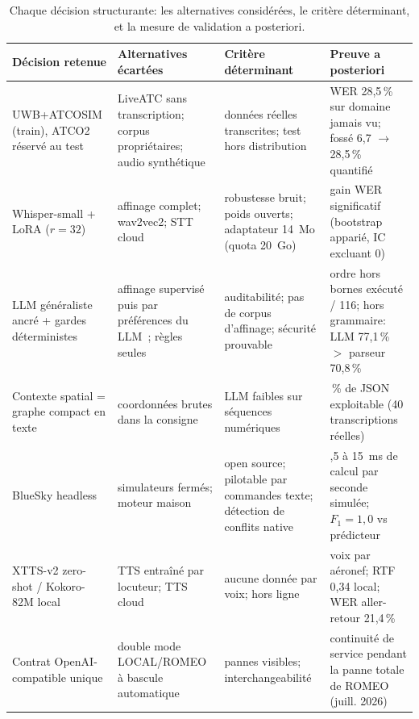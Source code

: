 \documentclass[11pt,a4paper]{article}
\begin{document}
\begin{table}[!htbp]
\centering
\caption[Chaque décision structurante]{Chaque décision structurante: les alternatives considérées, le critère déterminant, et la mesure de validation a posteriori.}
\label{tab:decisions}
\footnotesize
\begin{tabular}{>{\raggedright\arraybackslash}p{3.4cm} >{\raggedright\arraybackslash}p{3.6cm} >{\raggedright\arraybackslash}p{3.4cm} >{\raggedright\arraybackslash}p{4.2cm}}
\toprule
\rowcolor{lightgray}\textbf{Décision retenue} & \textbf{Alternatives écartées} & \textbf{Critère déterminant} & \textbf{Preuve a posteriori}\\
\midrule
UWB+ATCOSIM (train), ATCO2 réservé au test & LiveATC sans transcription; corpus propriétaires; audio synthétique & données réelles transcrites; test hors distribution & WER 28,5\,\% sur domaine jamais vu; fossé 6,7 $\rightarrow$ 28,5\,\% quantifié\\
Whisper-small + LoRA ($r{=}32$) & affinage complet; wav2vec2; STT cloud & robustesse bruit; poids ouverts; adaptateur 14~Mo (quota 20~Go) & gain WER significatif (bootstrap apparié, IC excluant 0)\\
LLM généraliste ancré + gardes déterministes & affinage supervisé puis par préférences du LLM~\cite{sharifi}; règles seules & auditabilité; pas de corpus d'affinage; sécurité prouvable & 0 ordre hors bornes exécuté / 116; hors grammaire: LLM 77,1\,\% $>$ parseur 70,8\,\%\\
Contexte spatial = graphe compact en texte & coordonnées brutes dans la consigne & LLM faibles sur séquences numériques~\cite{zhang} & 100\,\% de JSON exploitable (40 transcriptions réelles)\\
BlueSky headless & simulateurs fermés; moteur maison & open source; pilotable par commandes texte; détection de conflits native & 9,5 à 15~ms de calcul par seconde simulée; $F_1{=}1{,}0$ vs prédicteur\\
XTTS-v2 zero-shot / Kokoro-82M local & TTS entraîné par locuteur; TTS cloud & aucune donnée par voix; hors ligne & voix par aéronef; RTF 0,34 local; WER aller-retour 21,4\,\%\\
Contrat OpenAI-compatible unique & double mode LOCAL/ROMEO à bascule automatique & pannes visibles; interchangeabilité & continuité de service pendant la panne totale de ROMEO (juill. 2026)\\
\bottomrule
\end{tabular}
\end{table}
\end{document}
